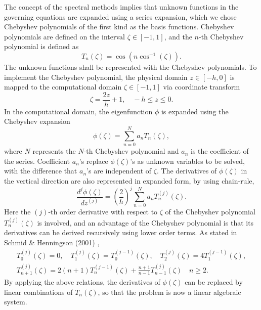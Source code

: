 The concept of the spectral methods implies that unknown functions in the governing equations are expanded using a series expansion, which we chose Chebyshev polynomials of the first kind as the basis functions. Chebyshev polynomials are defined on the interval $\zeta\in[-1,1]$, and the $n$-th Chebyshev polynomial is defined as
\begin{equation}
    T_n(\zeta)=\cos(n\cos^{-1}(\zeta)).
\end{equation}
The unknown functions shall be represented with the Chebyshev polynomials. To implement the Chebyshev polynomial, the physical domain $z\in[-h,0]$ is mapped to the computational domain $\zeta\in[-1,1]$ via coordinate transform
\begin{equation}
    \zeta=\frac{2z}{h}+1,\quad -h\leq z\leq 0.
\end{equation}
In the computational domain, the eigenfunction $\phi$ is expanded using the Chebyshev expansion
\begin{equation}
    \phi(\zeta) =\sum _{n=0}^{N} a_{n} T_{n}(\zeta),
\end{equation}
where $N$ represents the $N$-th Chebyshev polynomial and $a_n$ is the coefficient of the series. Coefficient $a_n$'s replace $\phi(\zeta)$'s as  unknown variables to be solved, with the difference that $a_n$'s are independent of $\zeta$. The derivatives of $\phi(\zeta)$ in the vertical direction are also represented in expanded form, by using chain-rule,
\begin{equation}
    \frac{d^{j} \phi ( \zeta )}{dz^{( j)}} =\left(\frac{2}{h}\right)^{j}\sum _{n=0}^{N} a_{n} T_{n}^{(j)}( \zeta ).
\end{equation}
Here the $(j)$-th order derivative with respect to $\zeta$ of the Chebyshev polynomial $T_{n}^{(j)}( \zeta )$ is involved, and an advantage of the Chebyshev polynomial is that its derivatives can be derived recursively using lower order terms. As stated in Schmid \& Henningson (2001) \cite{RN9},
\begin{equation}
\begin{array}{l}
\displaystyle T_{0}^{( j)}( \zeta ) =0,\quad T_{1}^{( j)}( \zeta ) =T_{0}^{( j-1)}( \zeta ) ,\quad T_{2}^{( j)}( \zeta ) =4T_{1}^{( j-1)}( \zeta ) ,\\
\displaystyle T_{n+1}^{( j)}( \zeta ) =2(n+1)T_{n}^{( j-1)}( \zeta ) +\frac{n+1}{n-1} T_{n-1}^{( j)}( \zeta ) \quad n\geq 2.
\end{array}
\end{equation}
By applying the above relations, the derivatives of $\phi(\zeta)$ can be replaced by linear combinations of $T_{n}( \zeta )$, so that the problem is now a linear algebraic system.

